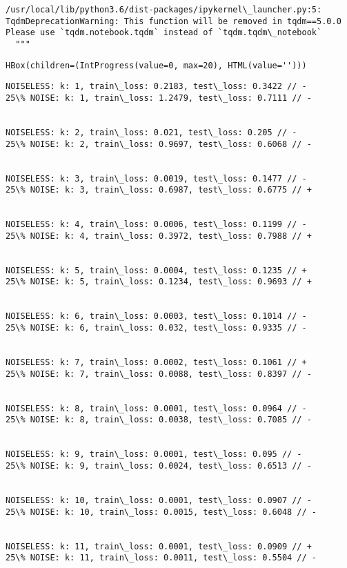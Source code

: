 \documentclass[11pt]{article}
\begin{document}
    \begin{Verbatim}[commandchars=\\\{\}]
/usr/local/lib/python3.6/dist-packages/ipykernel\_launcher.py:5:
TqdmDeprecationWarning: This function will be removed in tqdm==5.0.0
Please use `tqdm.notebook.tqdm` instead of `tqdm.tqdm\_notebook`
  """
    \end{Verbatim}

    
    \begin{verbatim}
HBox(children=(IntProgress(value=0, max=20), HTML(value='')))
    \end{verbatim}

    
    \begin{Verbatim}[commandchars=\\\{\}]
NOISELESS: k: 1, train\_loss: 0.2183, test\_loss: 0.3422 // -
25\% NOISE: k: 1, train\_loss: 1.2479, test\_loss: 0.7111 // -


NOISELESS: k: 2, train\_loss: 0.021, test\_loss: 0.205 // -
25\% NOISE: k: 2, train\_loss: 0.9697, test\_loss: 0.6068 // -


NOISELESS: k: 3, train\_loss: 0.0019, test\_loss: 0.1477 // -
25\% NOISE: k: 3, train\_loss: 0.6987, test\_loss: 0.6775 // +


NOISELESS: k: 4, train\_loss: 0.0006, test\_loss: 0.1199 // -
25\% NOISE: k: 4, train\_loss: 0.3972, test\_loss: 0.7988 // +


NOISELESS: k: 5, train\_loss: 0.0004, test\_loss: 0.1235 // +
25\% NOISE: k: 5, train\_loss: 0.1234, test\_loss: 0.9693 // +


NOISELESS: k: 6, train\_loss: 0.0003, test\_loss: 0.1014 // -
25\% NOISE: k: 6, train\_loss: 0.032, test\_loss: 0.9335 // -


NOISELESS: k: 7, train\_loss: 0.0002, test\_loss: 0.1061 // +
25\% NOISE: k: 7, train\_loss: 0.0088, test\_loss: 0.8397 // -


NOISELESS: k: 8, train\_loss: 0.0001, test\_loss: 0.0964 // -
25\% NOISE: k: 8, train\_loss: 0.0038, test\_loss: 0.7085 // -


NOISELESS: k: 9, train\_loss: 0.0001, test\_loss: 0.095 // -
25\% NOISE: k: 9, train\_loss: 0.0024, test\_loss: 0.6513 // -


NOISELESS: k: 10, train\_loss: 0.0001, test\_loss: 0.0907 // -
25\% NOISE: k: 10, train\_loss: 0.0015, test\_loss: 0.6048 // -


NOISELESS: k: 11, train\_loss: 0.0001, test\_loss: 0.0909 // +
25\% NOISE: k: 11, train\_loss: 0.0011, test\_loss: 0.5504 // -



\end{Verbatim}
\end{document}

